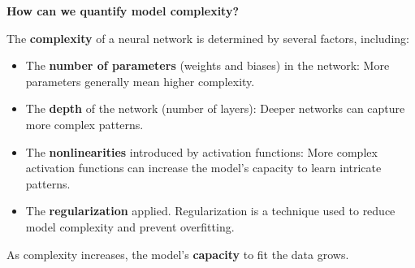 \highspace
\begin{flushleft}
    \textcolor{Green3}{ \textbf{How can we quantify model complexity?}}
\end{flushleft}
The \textbf{complexity} of a neural network is determined by several factors, including:
\begin{itemize}
    \item The \textbf{number of parameters} (weights and biases) in the network: More parameters generally mean higher complexity.
    \item The \textbf{depth} of the network (number of layers): Deeper networks can capture more complex patterns.
    \item The \textbf{nonlinearities} introduced by activation functions: More complex activation functions can increase the model's capacity to learn intricate patterns.
    \item The \textbf{regularization} applied. Regularization is a technique used to reduce model complexity and prevent overfitting.
\end{itemize}
As complexity increases, the model's \textbf{capacity} to fit the data grows.

